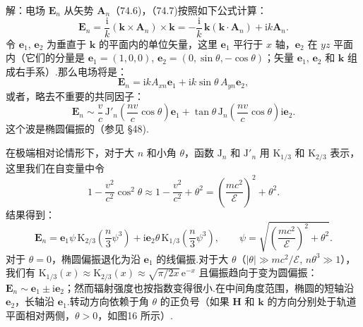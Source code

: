 \begin{xiti}
解：电场 $\boldsymbol{E}_n$ 从矢势 $\boldsymbol{A}_n$（74.6)，（74.7)按照如下公式计算：
\begin{equation*}
  \boldsymbol{E}_n=\frac{\mathrm{i}}{k}(\boldsymbol{k}\times\boldsymbol{A}_n)\times\boldsymbol{k}
  =-\frac{\mathrm{i}}{k}\,\boldsymbol{k}(\boldsymbol{k}\cdot\boldsymbol{A}_n)+\mathrm{i}k\boldsymbol{A}_n.
\end{equation*}
令 $\boldsymbol{e}_1$, $\boldsymbol{e}_2$ 为垂直于 $\boldsymbol{k}$ 的平面内的单位矢量，这里 $\boldsymbol{e}_1$ 平行于 $x$ 轴，$\boldsymbol{e}_2$ 在 $yz$ 平面内（它们的分量是 $\boldsymbol{e}_1=(1,0,0)$, $\boldsymbol{e}_2=(0,\sin\theta,-\cos\theta)$；矢量 $\boldsymbol{e}_1$, $\boldsymbol{e}_2$ 和 $\boldsymbol{k}$ 组成右手系）.那么电场将是：
\begin{equation*}
  \boldsymbol{E}_n=\mathrm{i}kA_{xn}\boldsymbol{e}_1+\mathrm{i}k\sin\theta\,A_{yn}\boldsymbol{e}_2,
\end{equation*}
或者，略去不重要的共同因子：
\begin{equation*}
  \boldsymbol{E}_n\sim\frac{v}{c}\,\mathrm{J}'_n\!\left(\frac{nv}{c}\cos\theta\right)\boldsymbol{e}_1
  +\tan\theta\,\mathrm{J}_n\!\left(\frac{nv}{c}\cos\theta\right)\mathrm{i}\boldsymbol{e}_2.
\end{equation*}
这个波是椭圆偏振的（参见 §48).

在极端相对论情形下，对于大 $n$ 和小角 $\theta$，函数 $\mathrm{J}_n$ 和 $\mathrm{J}'_n$ 用 $\mathrm{K}_{1/3}$ 和 $\mathrm{K}_{2/3}$ 表示，这里我们在自变量中令
\begin{equation*}
  1-\frac{v^2}{c^2}\cos^2\theta\approx 1-\frac{v^2}{c^2}+\theta^2
  =\left(\frac{mc^2}{\mathcal{E}}\right)^{\!2}+\theta^2.
\end{equation*}
结果得到：
\begin{equation*}
  \boldsymbol{E}_n=\boldsymbol{e}_1\psi\,\mathrm{K}_{2/3}\!\left(\frac{n}{3}\psi^3\right)
  +\mathrm{i}\boldsymbol{e}_2\theta\,\mathrm{K}_{1/3}\!\left(\frac{n}{3}\psi^3\right),\qquad
  \psi=\sqrt{\left(\frac{mc^2}{\mathcal{E}}\right)^{\!2}+\theta^2}.
\end{equation*}
对于 $\theta=0$，椭圆偏振退化为沿 $\boldsymbol{e}_1$ 的线偏振.对于大 $\theta$（$|\theta|\gg mc^2/\mathcal{E}$, $n\theta^3\gg 1$），我们有 $\mathrm{K}_{1/3}(x)\approx\mathrm{K}_{2/3}(x)\approx\sqrt{\pi/2x}\,\mathrm{e}^{-x}$ 且偏振趋向于变为圆偏振：$\boldsymbol{E}_n\sim\boldsymbol{e}_1\pm\mathrm{i}\boldsymbol{e}_2$；然而辐射强度也按指数变得很小.在中间角度范围，椭圆的短轴沿 $\boldsymbol{e}_2$，长轴沿 $\boldsymbol{e}_1$.转动方向依赖于角 $\theta$ 的正负号（如果 $\boldsymbol{H}$ 和 $\boldsymbol{k}$ 的方向分别处于轨道平面相对两侧，$\theta>0$，如图16 所示）.

\end{xiti}

